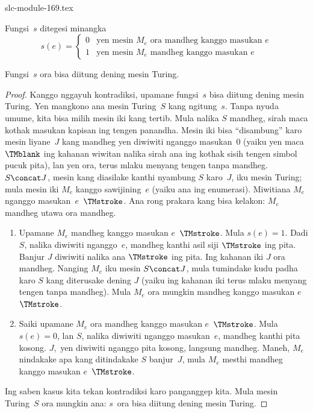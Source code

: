 \begin{filecontents*}[overwrite]{slc-module-169.tex}
\begin{defn} Fungsi~$s$ ditegesi minangka
\[
s(e) =
\begin{cases}
  \text{0} & \text{yen mesin~$M_e$ ora mandheg kanggo masukan $e$} \\
  \text{1} & \text{yen mesin~$M_e$ mandheg kanggo masukan $e$}
\end{cases}
\]
\end{defn}

\begin{lem}
Fungsi~$s$ ora bisa diitung dening mesin Turing.
\end{lem}

\begin{proof}
Kanggo nggayuh kontradiksi, upamane fungsi~$s$
bisa diitung dening mesin Turing. Yen mangkono
ana mesin Turing~$S$ kang ngitung~$s$.
%
 Tanpa nyuda umume, kita bisa milih mesin
iki kang tertib. Mula nalika $S$ mandheg,
sirah maca kothak masukan kapisan ing tengen panandha. Mesin iki bisa
``disambung'' karo mesin liyane~$J$ kang
mandheg yen diwiwiti nganggo masukan~$0$
(yaiku yen maca $\TMblank$ ing kahanan
wiwitan nalika sirah ana ing kothak sisih
tengen simbol pucuk pita), lan yen ora,
terus mlaku menyang tengen tanpa mandheg.
$S \concat J$, mesin kang diasilake kanthi
nyambung $S$ karo~$J$, iku mesin Turing;
mula mesin iki $M_e$ kanggo sawijining~$e$
(yaiku ana ing enumerasi). Miwitiana $M_e$
nganggo masukan~$e$~$\TMstroke$. Ana rong
prakara kang bisa kelakon: $M_e$ mandheg utawa ora mandheg.
\begin{enumerate}
\item Upamane $M_e$ mandheg kanggo masukan
  $e$~$\TMstroke$. Mula $s(e) = 1$.
  Dadi $S$, nalika diwiwiti nganggo~$e$,
  mandheg kanthi asil siji $\TMstroke$
  ing pita. Banjur $J$ diwiwiti nalika ana
  $\TMstroke$ ing pita. Ing kahanan iki
  $J$ ora mandheg. Nanging $M_e$ iku mesin
  $S \concat J$, mula tumindake kudu padha
  karo $S$ kang diterusake dening $J$
  (yaiku ing kahanan iki terus mlaku
  menyang tengen tanpa mandheg). Mula
  $M_e$ ora mungkin mandheg kanggo masukan
  $e$~$\TMstroke$.

\item Saiki upamane $M_e$ ora mandheg
  kanggo masukan $e$~$\TMstroke$.
  Mula $s(e) = 0$, lan $S$, nalika
  diwiwiti nganggo masukan~$e$, mandheg
  kanthi pita kosong. $J$,~yen diwiwiti
  nganggo pita kosong, langsung mandheg.
  Maneh, $M_e$ nindakake apa kang
  ditindakake $S$ banjur~$J$, mula
  $M_e$ mesthi mandheg kanggo masukan
  $e$~$\TMstroke$.
\end{enumerate}
Ing saben kasus kita tekan kontradiksi karo
panganggep kita. Mula mesin Turing~$S$
ora mungkin ana: $s$~ora bisa diitung
dening mesin Turing.
\end{proof}


\end{filecontents*}
